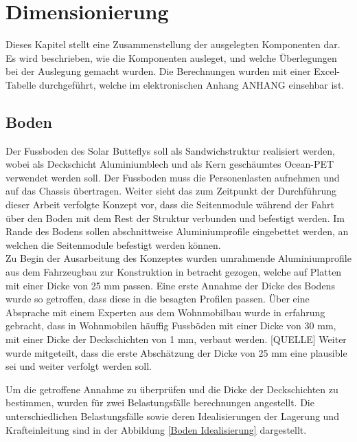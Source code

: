 \section{Dimensionierung}
Dieses Kapitel stellt eine Zusammenstellung der ausgelegten Komponenten dar. Es wird beschrieben, wie die Komponenten ausleget, und welche Überlegungen bei der Auslegung gemacht wurden. Die Berechnungen wurden mit einer Excel-Tabelle durchgeführt, welche im elektronischen Anhang ANHANG einsehbar ist.

\subsection{Boden}
Der Fussboden des Solar Butteflys soll als Sandwichstruktur realisiert werden, wobei als Deckschicht Aluminiumblech und als Kern geschäumtes Ocean-PET verwendet werden soll. Der Fussboden muss die Personenlasten aufnehmen und auf das Chassis übertragen. Weiter sieht das zum Zeitpunkt der Durchführung dieser Arbeit verfolgte Konzept vor, dass die Seitenmodule während der Fahrt über den Boden mit dem Rest der Struktur verbunden und befestigt werden. Im Rande des Bodens sollen abschnittweise Aluminiumprofile eingebettet werden, an welchen die Seitenmodule befestigt werden können.\\
Zu Begin der Ausarbeitung des Konzeptes wurden umrahmende Aluminiumprofile aus dem Fahrzeugbau zur Konstruktion in betracht gezogen, welche auf Platten mit einer Dicke von 25 mm passen. Eine erste Annahme der Dicke des Bodens wurde so getroffen, dass diese in die besagten Profilen passen. Über eine Absprache mit einem Experten aus dem Wohnmobilbau wurde in erfahrung gebracht, dass in Wohnmobilen häuffig Fussböden mit einer Dicke von 30 mm, mit einer Dicke der Deckschichten von 1 mm, verbaut werden. [QUELLE] Weiter wurde mitgeteilt, dass die erste Abschätzung der Dicke von 25 mm eine plausible sei und weiter verfolgt werden soll.

Um die getroffene Annahme zu überprüfen und die Dicke der Deckschichten zu bestimmen, wurden für zwei Belastungsfälle berechnungen angestellt. Die unterschiedlichen Belastungsfälle sowie deren Idealisierungen der Lagerung und Krafteinleitung sind in der Abbildung \ref{Boden Idealisierung} dargestellt.

